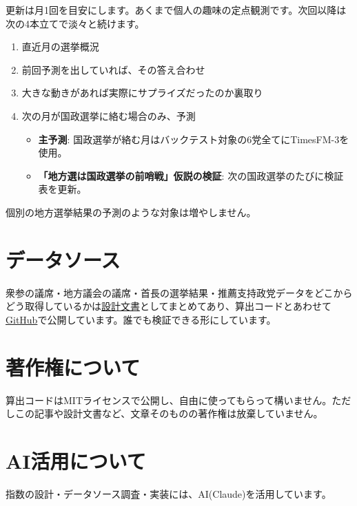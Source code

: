 \documentclass[a4paper,11pt]{ltjsarticle}
\begin{document}
更新は月1回を目安にします。あくまで個人の趣味の定点観測です。次回以降は次の4本立てで淡々と続けます。

\begin{enumerate}[nosep]
\item 直近月の選挙概況
\item 前回予測を出していれば、その答え合わせ
\item 大きな動きがあれば実際にサプライズだったのか裏取り
\item 次の月が国政選挙に絡む場合のみ、予測
  \begin{itemize}[nosep]
  \item \textbf{主予測}: 国政選挙が絡む月はバックテスト対象の6党全てにTimesFM-3を使用。
  \item \textbf{「地方選は国政選挙の前哨戦」仮説の検証}: 次の国政選挙のたびに検証表を更新。
  \end{itemize}
\end{enumerate}

個別の地方選挙結果の予測のような対象は増やしません。

\section*{データソース}

衆参の議席・地方議会の議席・首長の選挙結果・推薦支持政党データをどこからどう取得しているかは\href{https://github.com/hiromichikimura-lang/seiryoku-shisu/blob/master/design_document.pdf}{設計文書}としてまとめてあり、算出コードとあわせて\href{https://github.com/hiromichikimura-lang/seiryoku-shisu}{GitHub}で公開しています。誰でも検証できる形にしています。

\section*{著作権について}

算出コードはMITライセンスで公開し、自由に使ってもらって構いません。ただしこの記事や設計文書など、文章そのものの著作権は放棄していません。

\section*{AI活用について}

指数の設計・データソース調査・実装には、AI(Claude)を活用しています。
\end{document}
